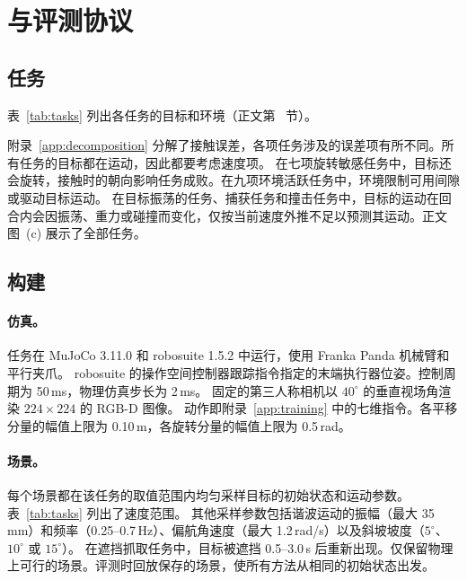 \section{\bench 与评测协议}
\label{app:benchmark}

\subsection{任务}
\label{app:tasks}
\label{app:roles}
表~\ref{tab:tasks} 列出各任务的目标和环境（正文第~ 节）。

附录~\ref{app:decomposition} 分解了接触误差，各项任务涉及的误差项有所不同。所有任务的目标都在运动，因此都要考虑速度项。
在七项旋转敏感任务中，目标还会旋转，接触时的朝向影响任务成败。在九项环境活跃任务中，环境限制可用间隙或驱动目标运动。
在目标振荡的任务、捕获任务和撞击任务中，目标的运动在回合内会因振荡、重力或碰撞而变化，仅按当前速度外推不足以预测其运动。正文图~(c) 展示了全部任务。



\subsection{构建}
\label{app:splits}
\paragraph{仿真。}
任务在 MuJoCo 3.11.0 和 robosuite 1.5.2 \cite{mujoco,robosuite} 中运行，使用 Franka Panda 机械臂和平行夹爪。
robosuite 的操作空间控制器跟踪指令指定的末端执行器位姿。控制周期为 50\,ms，物理仿真步长为 2\,ms。
固定的第三人称相机以 $40^\circ$ 的垂直视场角渲染 $224\times224$ 的 RGB-D 图像。
动作即附录~\ref{app:training} 中的七维指令。各平移分量的幅值上限为 0.10\,m，各旋转分量的幅值上限为 0.5\,rad。

\paragraph{场景。}
每个场景都在该任务的取值范围内均匀采样目标的初始状态和运动参数。表~\ref{tab:tasks} 列出了速度范围。
其他采样参数包括谐波运动的振幅（最大 35\,mm）和频率（0.25--0.7\,Hz）、偏航角速度（最大 1.2\,rad/s）以及斜坡坡度（$5^\circ$、$10^\circ$ 或 $15^\circ$）。
在遮挡抓取任务中，目标被遮挡 0.5--3.0\,s 后重新出现。仅保留物理上可行的场景。评测时回放保存的场景，使所有方法从相同的初始状态出发。

